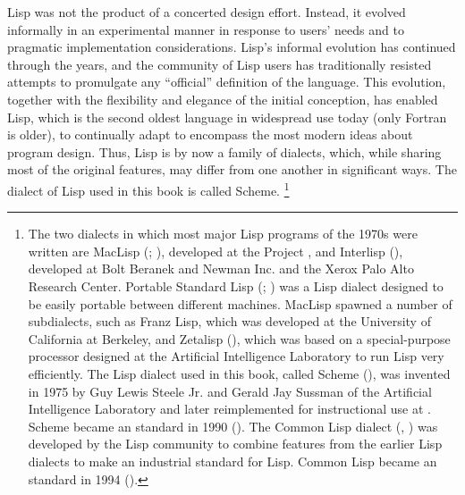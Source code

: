 Lisp was not the product of a concerted design effort.
Instead, it evolved informally in an experimental manner in response to users’ needs and to pragmatic implementation considerations.
Lisp’s informal evolution has continued through the years, and the community of Lisp users has traditionally resisted attempts to promulgate any “official” definition of the language.
This evolution, together with the flexibility and elegance of the initial conception, has enabled Lisp, which is the second oldest language in widespread use today (only Fortran is older), to continually adapt to encompass the most modern ideas about program design.
Thus, Lisp is by now a family of dialects, which, while sharing most of the original features, may differ from one another in significant ways.
The dialect of Lisp used in this book is called Scheme.%
\footnote{
	The two dialects in which most major Lisp programs of the 1970s were written are MacLisp (; ), developed at the  Project , and Interlisp (), developed at Bolt Beranek and Newman Inc. and the Xerox Palo Alto Research Center.
	Portable Standard Lisp (; ) was a Lisp dialect designed to be easily portable between different machines.
	MacLisp spawned a number of subdialects, such as Franz Lisp, which was developed at the University of California at Berkeley, and Zetalisp (), which was based on a special-purpose processor designed at the  Artificial Intelligence Laboratory to run Lisp very efficiently.
	The Lisp dialect used in this book, called Scheme (), was invented in 1975 by Guy Lewis Steele Jr. and Gerald Jay Sussman of the  Artificial Intelligence Laboratory and later reimplemented for instructional use at .
	Scheme became an  standard in 1990 ().
	The Common Lisp dialect (, ) was developed by the Lisp community to combine features from the earlier Lisp dialects to make an industrial standard for Lisp.
	Common Lisp became an  standard in 1994 (\autocite{ansi_common_lisp}).
}

